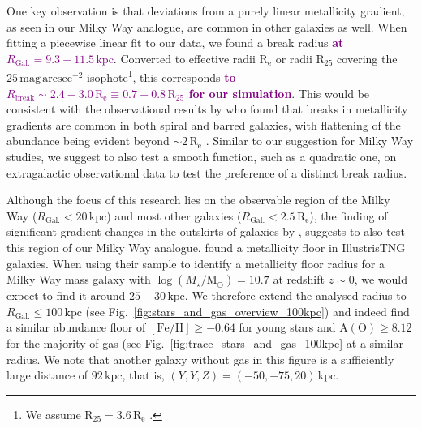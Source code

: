 \documentclass[twocolumn,apj,numberedappendix,appendixfloats,twocolappendix]{openjournal}
\newcommand{\adjusted}[1]{\textbf{\textcolor{purple}{#1}}}
\begin{document}
\begin{CJK*}{UTF8}{gbsn}
One key observation is that deviations from a purely linear metallicity gradient, as seen in our Milky Way analogue, are common in other galaxies as well. When fitting a piecewise linear fit to our data, we found a break radius \adjusted{at $R_\mathrm{Gal.} = 9.3-11.5\,\mathrm{kpc}$}. Converted to effective radii $\mathrm{R_e}$ or radii $\mathrm{R_{25}}$ covering the $25\,\mathrm{mag\,arcsec^{-2}}$ isophote\footnote{We assume $\mathrm{R_{25}} = 3.6\,\mathrm{R_e}$ \citep{Williams2009, Chen2023}.}, this corresponds \adjusted{to $R_\mathrm{break} \sim 2.4-3.0\,\mathrm{R_e} \equiv 0.7-0.8\,\mathrm{R_{25}}$ for our simulation}. This would be consistent with the observational results by \citet{Sanchez2014} who found that breaks in metallicity gradients are common in both spiral and barred galaxies, with flattening of the abundance being evident beyond $\sim 2\,\mathrm{R_e}$ \citep[compare also to][]{Belfiore2017}. Similar to our suggestion for Milky Way studies, we suggest to also test a smooth function, such as a quadratic one, on extragalactic observational data \citep[e.g.][]{Bresolin2012, Chen2023} to test the preference of a distinct break radius.

Although the focus of this research lies on the observable region of the Milky Way ($R_\mathrm{Gal.} < 20\,\mathrm{kpc}$) and most other galaxies ($R_\mathrm{Gal.} < 2.5\,\mathrm{R_e}$), the finding of significant gradient changes in the outskirts of galaxies by \citet{Garcia2023}, suggests to also test this region of our Milky Way analogue. \citet[][see their Fig.~4]{Garcia2023} found a metallicity floor in IllustrisTNG galaxies. When using their sample to identify a metallicity floor radius for a Milky Way mass galaxy with $\log(M_\star/\mathrm{M_\odot}) = 10.7$ \citep{BlandHawthorn_Gerhard2016} at redshift $z \sim 0$, we would expect to find it around $25-30\,\mathrm{kpc}$. We therefore extend the analysed radius to $R_\mathrm{Gal.} \leq 100\,\mathrm{kpc}$ (see Fig.~\ref{fig:stars_and_gas_overview_100kpc}) and indeed find a similar abundance floor of $\mathrm{[Fe/H]} \geq -0.64$ for young stars and $\mathrm{A(O)} \geq 8.12$ for the majority of gas (see Fig.~\ref{fig:trace_stars_and_gas_100kpc} at a similar radius. We note that another galaxy without gas in this figure is a sufficiently large distance of $92\,\mathrm{kpc}$, that is, $(Y,Y,Z) = (-50,-75,20)\,\mathrm{kpc}$.


\end{CJK*}
\end{document}
